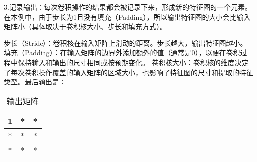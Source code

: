 3.记录输出：每次卷积操作的结果都会被记录下来，形成新的特征图的一个元素。在本例中，由于步长为1且没有填充（Padding），所以输出特征图的大小会比输入矩阵小（具体取决于卷积核大小、步长和填充方式）。

步长（Stride）：卷积核在输入矩阵上滑动的距离。步长越大，输出特征图越小。
填充（Padding）：在输入矩阵的边界外添加额外的值（通常是0），以便在卷积过程中保持输入和输出的尺寸相同或按预期变化。
卷积核大小：卷积核的维度决定了每次卷积操作覆盖的输入矩阵的区域大小，也影响了特征图的尺寸和提取的特征类型。
​
最后输出是：\begin{table}[ht]
\centering
\caption{输出矩阵}\label{tab_CNN23}
\begin{tabular}{|c|c|c|}
\hline
1 & * & * \\
\hline
* & * & * \\
\hline
* & * & * \\
\hline
\end{tabular}
\end{table}
